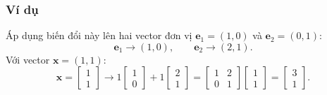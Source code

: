 \begin{frame}
    \frametitle{Ví dụ}
    Áp dụng biến đổi này lên hai vector đơn vị \(\mathbf{e}_1 =(1,0)\) và \(\mathbf{e}_2 =(0,1)\):
\[\mathbf{e}_1 \rightarrow (1,0),\qquad \mathbf{e}_2 \rightarrow (2,1).\] Với vector \(\mathbf{x}=(1,1)\):
\[\mathbf{x}=\begin{bmatrix}
1\\1
\end{bmatrix}\rightarrow 1\begin{bmatrix}
1\\0
\end{bmatrix}+1\begin{bmatrix}
2\\1
\end{bmatrix}=\begin{bmatrix}
    1&2\\0&1
\end{bmatrix}\begin{bmatrix}
    1\\1
\end{bmatrix}=\begin{bmatrix}
    3\\1
\end{bmatrix}.\]
\end{frame}


